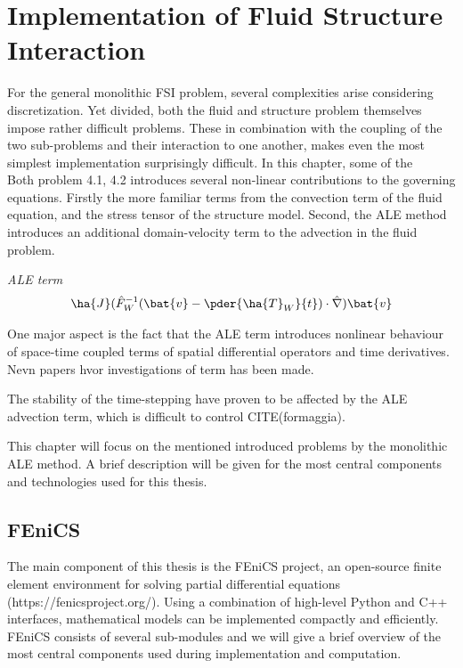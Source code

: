 \chapter{Implementation of Fluid Structure Interaction}

For the general monolithic FSI problem, several complexities arise considering discretization. Yet divided, both the fluid and structure problem themselves impose rather difficult problems. These in combination with the coupling of the two sub-problems and their interaction to one another, makes even the most simplest implementation surprisingly difficult.  In this chapter, some of the  \\
Both problem 4.1, 4.2 introduces several non-linear contributions to the governing equations. Firstly the more familiar terms from the convection term of the fluid equation, and the stress tensor of the structure model. Second, the ALE method introduces an additional domain-velocity term to the advection in the fluid problem.

\begin{prob}
\textit{ALE term}\begin{align*}
\ha{J} (\hat{F}_W^{-1}(\bat{v} - \pder{\ha{T}_W}{t}) \cdot \hat{\nabla}) \bat{v}
\end{align*} 
\end{prob}
One major aspect is the fact that the ALE term introduces nonlinear behaviour of space-time coupled terms of spatial differential operators and time derivatives.
Nevn papers hvor investigations of term has been made.

The stability of the time-stepping have proven to be affected by the ALE advection term, which is difficult to control CITE(formaggia).

 This chapter will focus on the mentioned introduced problems by the monolithic ALE method. A brief description will be given for the most central components and technologies used for this thesis.   

\section{FEniCS}
The main component of this thesis is the FEniCS project, an open-source finite element environment for solving partial differential equations (https://fenicsproject.org/). Using a combination of high-level Python and C++ interfaces, mathematical models can be implemented compactly and efficiently. FEniCS consists of several sub-modules and we will give a brief overview of the most central components used during implementation and computation.

